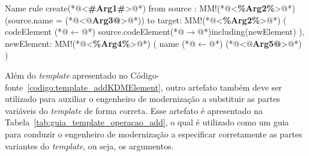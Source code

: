 \begin{codigo}[caption={[\textit{Template} ATL para realizar a operação atômica \texttt{add}.] \textit{Template} ATL para realizar a operação atômica \texttt{add}.},escapeinside={(*@}{@*)}, basicstyle=\footnotesize, label={codigo:template_addKDMElement}, language=ATL]{Name}
rule create(*@<\textbf{\#Arg1\#}>@*){
	from
		source : MM!(*@<\textbf{\%Arg2\%}>@*) (source.name = (*@<\textbf{$@$Arg3@}>@*))
	to 
		target: MM!(*@<\textbf{\%Arg2\%}>@*) (
			codeElement (*@$\leftarrow$@*) source.codeElement(*@$\rightarrow$@*)including(newElement)
		),
		newElement: MM!(*@<\textbf{\%Arg4\%}>@*) (
			name (*@$\leftarrow$@*) (*@<\textbf{$@$Arg5@}>@*)
		)
}
\end{codigo}




Além do \textit{template} apresentado no Código-fonte~\ref{codigo:template_addKDMElement}, outro artefato também deve ser utilizado para auxiliar o engenheiro de modernização a substituir as partes variáveis do \textit{template} de forma correta. Esse artefato é apresentado na Tabela~\ref{tab:guia_template_operacao_add}, o qual é utilizado como um guia para conduzir o engenheiro de modernização a especificar corretamente as partes variantes do \textit{template}, ou seja, os argumentos.

